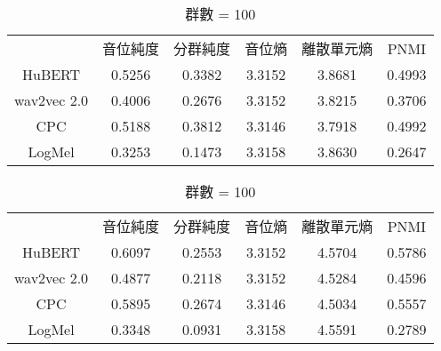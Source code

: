









\begin{table}[!htbp]
    \centering
    \begin{subtable}[t]{\textwidth}
        \centering
        \begin{tabular}{cccccc}
            & 音位純度 & 分群純度 & 音位熵 & 離散單元熵 & PNMI \\
            HuBERT      &   0.5256   &  0.3382 &   3.3152  &  3.8681    &     0.4993   \\   %
            wav2vec 2.0 &   0.4006   &  0.2676 &   3.3152  &  3.8215    &     0.3706   \\   %
            CPC         &   0.5188   &  0.3812 &   3.3146  &  3.7918    &     0.4992   \\   %
            LogMel      &   0.3253   &  0.1473 &   3.3158  &  3.8630    &     0.2647   \\   %
        \end{tabular}
        \caption{群數 = 50}
        \label{tab:ch3-clu050}
    \end{subtable}

    \vspace{0.5cm}

    \begin{subtable}[t]{\textwidth}
        \centering
        \begin{tabular}{cccccc}
            & 音位純度 & 分群純度 & 音位熵 & 離散單元熵 & PNMI \\
            HuBERT      &   0.6097   &  0.2553 &   3.3152  &  4.5704    &     0.5786   \\   %
            wav2vec 2.0 &   0.4877   &  0.2118 &   3.3152  &  4.5284    &     0.4596   \\   %
            CPC         &   0.5895   &  0.2674 &   3.3146  &  4.5034    &     0.5557   \\   %
            LogMel      &   0.3348   &  0.0931 &   3.3158  &  4.5591    &     0.2789   \\   %
        \end{tabular}
        \caption{群數 = 100}
        \label{tab:ch3-clu100}
    \end{subtable}


\end{table}
